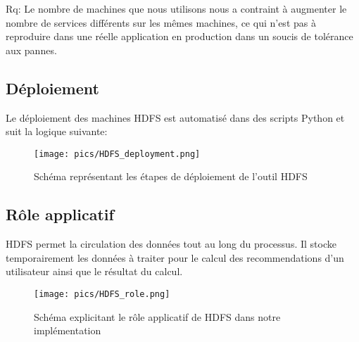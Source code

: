 Rq: Le nombre de machines que nous utilisons nous a contraint à augmenter le nombre de services différents sur les mêmes machines, ce qui n'est pas à reproduire dans une réelle application en production dans un soucis de tolérance aux pannes.

\subsection{Déploiement}

Le déploiement des machines HDFS est automatisé dans des scripts Python et suit la logique suivante: 

\begin{figure}[h]
    \centering
    \texttt{[image: pics/HDFS\_deployment.png]}
    \caption{Schéma représentant les étapes de déploiement de l'outil HDFS}
\end{figure}
\FloatBarrier

\subsection{Rôle applicatif}

HDFS permet la circulation des données tout au long du processus. Il stocke temporairement les données à traiter pour le calcul des recommendations d'un utilisateur ainsi que le résultat du calcul.

\begin{figure}[h]
    \centering
    \texttt{[image: pics/HDFS\_role.png]}
    \caption{Schéma explicitant le rôle applicatif de HDFS dans notre implémentation}
\end{figure}
\FloatBarrier